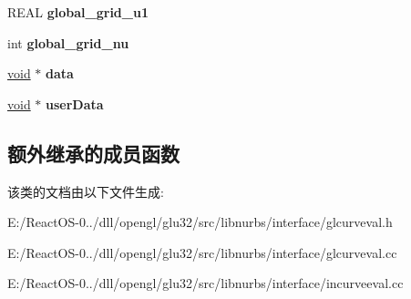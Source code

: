 \begin{DoxyCompactItemize}
\item 
\mbox{\label{class_open_g_l_curve_evaluator_a2bf554d4d9e35682bf1c617a60593031}} 
R\+E\+AL {\bfseries global\+\_\+grid\+\_\+u1}
\item 
\mbox{\label{class_open_g_l_curve_evaluator_ae145d4d62150d81dc4fee33f4a2e8230}} 
int {\bfseries global\+\_\+grid\+\_\+nu}
\item 
\mbox{\label{class_open_g_l_curve_evaluator_ae0677f5445c267c93922dc74fdba7cf6}} 
\hyperlink{interfacevoid}{void} $\ast$ {\bfseries data}
\item 
\mbox{\label{class_open_g_l_curve_evaluator_a3693e5eff84ac244da6174695cc09b50}} 
\hyperlink{interfacevoid}{void} $\ast$ {\bfseries user\+Data}
\end{DoxyCompactItemize}
\subsection*{额外继承的成员函数}


该类的文档由以下文件生成\+:\begin{DoxyCompactItemize}
\item 
E\+:/\+React\+O\+S-\/0../dll/opengl/glu32/src/libnurbs/interface/glcurveval.\+h\item 
E\+:/\+React\+O\+S-\/0../dll/opengl/glu32/src/libnurbs/interface/glcurveval.\+cc\item 
E\+:/\+React\+O\+S-\/0../dll/opengl/glu32/src/libnurbs/interface/incurveeval.\+cc\end{DoxyCompactItemize}

